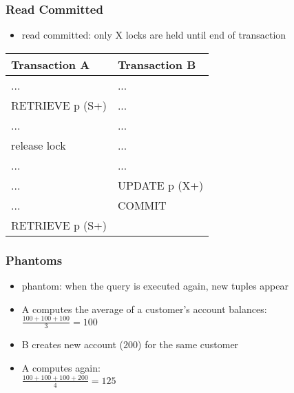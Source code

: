 \documentclass[dvipsnames]{beamer}
\theoremstyle{plain}
\begin{document}
\begin{frame}[fragile]
  \frametitle{Read Committed}

  \begin{itemize}
    \item read committed: only X locks are held until end of transaction
  \end{itemize}

  \begin{table}
    \begin{tabular}{ll}
Transaction A   & Transaction B\\\hline
...             & ...          \\\pause
RETRIEVE p (S+) & ...          \\\pause
...             & ...          \\
release lock    & ...          \\\pause
...             & ...          \\
...             & UPDATE p (X+)\\
...             & COMMIT       \\\pause
RETRIEVE p (S+) &
    \end{tabular}
  \end{table}
\end{frame}

\begin{frame}
  \frametitle{Phantoms}

  \begin{itemize}
    \item \alert{phantom}: when the query is executed again, new tuples appear
  \end{itemize}

  \begin{example}
    \begin{itemize}
      \item A computes the average of a customer's account balances:\\
        \smallskip
        $\frac{100+100+100}{3}=100$

      \pause
      \item B creates new account ($200$) for the same customer
      \item A computes again:\\
        \smallskip
        $\frac{100+100+100+200}{4}=125$
    \end{itemize}
  \end{example}
\end{frame}
\end{document}
